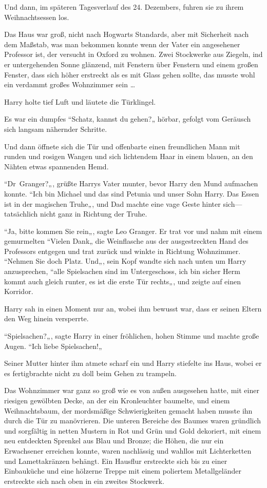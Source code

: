 {Und dann, im späteren Tagesverlauf des 24. Dezembers, fuhren sie zu ihrem Weihnachtsessen los.

Das Haus war groß, nicht nach Hogwarts Standards, aber mit Sicherheit nach dem Maßstab, was man bekommen konnte wenn der Vater ein angesehener Professor ist, der versucht in Oxford zu wohnen. Zwei Stockwerke aus Ziegeln, ind er untergehenden Sonne glänzend, mit Fenstern über Fenstern und einem großen Fenster, dass sich höher erstreckt als es mit Glass gehen sollte, das musste wohl ein verdammt großes Wohnzimmer sein …

Harry holte tief Luft und läutete die Türklingel.

Es war ein dumpfes “Schatz, kannst du gehen?„ hörbar, gefolgt vom Geräusch sich langsam nähernder Schritte.

Und dann öffnete sich die Tür und offenbarte einen freundlichen Mann mit runden und rosigen Wangen und sich lichtendem Haar in einem blauen, an den Nähten etwas spannenden Hemd.

“Dr~Granger?„, grüßte Harrys Vater munter, bevor Harry den Mund aufmachen konnte. “Ich bin Michael und das sind Petunia und unser Sohn Harry. Das Essen ist in der magischen Truhe„, und Dad machte eine vage Geste hinter sich—tatsächlich nicht ganz in Richtung der Truhe.

“Ja, bitte kommen Sie rein„, sagte Leo Granger. Er trat vor und nahm mit einem gemurmelten “Vielen Dank„ die Weinflasche aus der ausgestreckten Hand des Professors entgegen und trat zurück und winkte in Richtung Wohnzimmer. “Nehmen Sie doch Platz. Und„, sein Kopf wandte sich nach unten um Harry anzusprechen, “alle Spielsachen sind im Untergeschoss, ich bin sicher Herm kommt auch gleich runter, es ist die erste Tür rechts„, und zeigte auf einen Korridor.

Harry sah in einen Moment nur an, wobei ihm bewusst war, dass er seinen Eltern den Weg hinein versperrte.

“Spielsachen?„, sagte Harry in einer fröhlichen, hohen Stimme und machte große Augen. “Ich liebe Spielsachen!„

Seiner Mutter hinter ihm atmete scharf ein und Harry stiefelte ins Haus, wobei er es fertigbrachte nicht zu doll beim Gehen zu trampeln.

Das Wohnzimmer war ganz so groß wie es von außen ausgesehen hatte, mit einer riesigen gewölbten Decke, an der ein Kronleuchter baumelte, und einem Weihnachtsbaum, der mordsmäßige Schwierigkeiten gemacht haben musste ihn durch die Tür zu manövrieren. Die unteren Bereiche des Baumes waren gründlich und sorgfältig in netten Mustern in Rot und Grün und Gold dekoriert, mit einem neu entdeckten Sprenkel aus Blau und Bronze; die Höhen, die nur ein Erwachsener erreichen konnte, waren nachlässig und wahllos mit Lichterketten und Lamettakränzen behängt. Ein Hausflur erstreckte sich bis zu einer Einbauküche und eine hölzerne Treppe mit einem poliertem Metallgeländer erstreckte sich nach oben in ein zweites Stockwerk.

}
